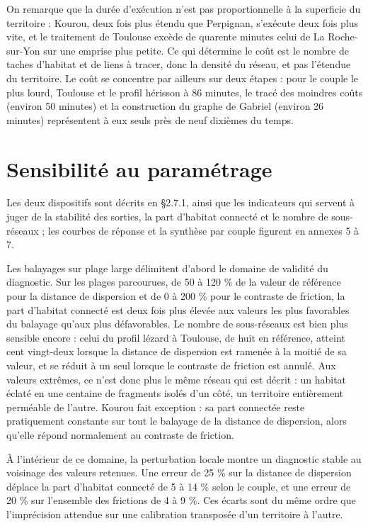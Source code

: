 \documentclass[a4paper,12pt]{report}
\begin{document}
On remarque que la durée d'exécution n'est pas proportionnelle à la superficie du territoire : Kourou, deux fois plus étendu que Perpignan, s'exécute deux fois plus vite, et le traitement de Toulouse excède de quarente minutes celui de La Roche-sur-Yon sur une emprise plus petite. Ce qui détermine le coût est le nombre de taches d'habitat et de liens à tracer, donc la densité du réseau, et pas l'étendue du territoire. Le coût se concentre par ailleurs sur deux étapes : pour le couple le plus lourd, Toulouse et le profil hérisson à 86 minutes, le tracé des moindres coûts (environ 50 minutes) et la construction du graphe de Gabriel (environ 26 minutes) représentent à eux seuls près de neuf dixièmes du temps.

\section{Sensibilité au paramétrage}
Les deux dispositifs sont décrits en §2.7.1, ainsi que les indicateurs qui servent à juger de la stabilité des sorties, la part d'habitat connecté et le nombre de sous-réseaux ; les courbes de réponse et la synthèse par couple figurent en annexes 5 à 7.
 
Les balayages sur plage large délimitent d'abord le domaine de validité du diagnostic. Sur les plages parcourues, de 50 à 120 \% de la valeur de référence pour la distance de dispersion et de 0 à 200 \% pour le contraste de friction, la part d'habitat connecté est deux fois plus élevée aux valeurs les plus favorables du balayage qu'aux plus défavorables. Le nombre de sous-réseaux est bien plus sensible encore : celui du profil lézard à Toulouse, de huit en référence, atteint cent vingt-deux lorsque la distance de dispersion est ramenée à la moitié de sa valeur, et se réduit à un seul lorsque le contraste de friction est annulé. Aux valeurs extrêmes, ce n'est donc plus le même réseau qui est décrit : un habitat éclaté en une centaine de fragments isolés d'un côté, un territoire entièrement perméable de l'autre. Kourou fait exception : sa part connectée reste pratiquement constante sur tout le balayage de la distance de dispersion, alors qu'elle répond normalement au contraste de friction.
 
À l'intérieur de ce domaine, la perturbation locale montre un diagnostic stable au voisinage des valeurs retenues. Une erreur de 25 \% sur la distance de dispersion déplace la part d'habitat connecté de 5 à 14 \% selon le couple, et une erreur de 20 \% sur l'ensemble des frictions de 4 à 9 \%. Ces écarts sont du même ordre que l'imprécision attendue sur une calibration transposée d'un territoire à l'autre.
 
\end{document}
